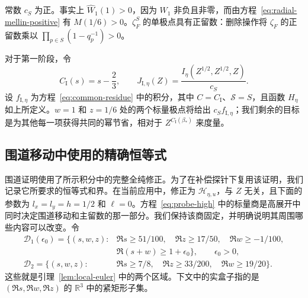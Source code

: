 \documentclass[11pt,a4paper]{article}
\numberwithin{equation}{section}
\numberwithin{figure}{section}
\theoremstyle{definition}
\theoremstyle{remark}
\begin{document}
常数 $c_S$ 为正。事实上 $\widehat W_1(1)>0$，因为 $W_1$ 非负且非零，而由方程~\eqref{eq:radial-mellin-positive} 有 $M(1/6)>0$。$\zeta_F^S$ 的单极点具有正留数：删除操作将 $\zeta_F$ 的正留数乘以 $\prod_{p\in S}(1-q_p^{-1})>0$。

对于第一阶段，令
\[
 C_{\mathrm I}(s)=s-\frac23,\qquad
 J_{\mathrm I,\eta}(Z)=\frac{I_\eta(Z^{1/2},Z^{1/2},Z)}{c_S}.
\]
设 $f_{\mathrm I,\eta}$ 为方程~\eqref{eq:common-residue} 中的积分，其中 $C=C_{\mathrm I}$、$\mathcal S=S$，且函数 $H_\eta$ 如上所定义。$w=1$ 和 $z=1/6$ 处的两个标量极点将给出 $c_S f_{\mathrm I,\eta}$；我们剩余的目标是为其他每一项获得共同的幂节省，相对于 $Z^{C_{\mathrm I}(\beta_*)}$ 来度量。

\subsection{围道移动中使用的精确恒等式}

围道证明使用了所示积分中的完整全纯修正。为了在补偿探针下复用该证明，我们记录它所要求的恒等式和界。在当前应用中，修正为 $\mathcal H_{\eta,u}$，与 $Z$ 无关，且下面的参数为 $l_x=l_y=h=1/2$ 和 $\ell=0$。方程~\eqref{eq:probe-high} 中的标量商是高展开中同时决定围道移动和主留数的那一部分。我们保持该商固定，并明确说明其周围哪些内容可以改变。令
\[
 \begin{split}
 \mathcal D_1(\epsilon_0)=\{(s,w,z):{}&\Re s\ge51/100,\quad
       \Re z\ge17/50,\quad \Re w\ge-1/100,\\
       &\Re(s+w)\ge1+\epsilon_0\},\qquad \epsilon_0>0,\\
 \mathcal D_2=\{(s,w,z):{}&\Re s\ge7/8,\quad
       \Re z\ge33/200,\quad \Re w\ge19/20\}.
 \end{split}
\]
这些就是引理~\ref{lem:local-euler} 中的两个区域。下文中的实盒子指的是 $(\Re s,\Re w,\Re z)$ 的 $\mathbb R^3$ 中的紧矩形子集。
\end{document}
